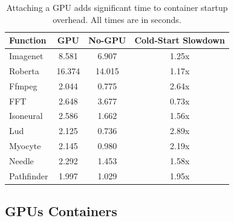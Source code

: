 \begin{table}
  \caption{Attaching a GPU adds significant time to container startup overhead. All times are in seconds.}
  \label{tab:gpu-attatch}
  \vspace{\captionspace}
  \begin{tabular}{lccc}
    \hline
    Function & GPU & No-GPU & Cold-Start Slowdown \\
    \hline
  Imagenet & 8.581 & 6.907 & 1.25x \\
  Roberta & 16.374 & 14.015 & 1.17x \\
  Ffmpeg & 2.044 & 0.775 & 2.64x \\
  FFT & 2.648 & 3.677 & 0.73x \\
  Isoneural & 2.586 & 1.662 & 1.56x \\
  Lud & 2.125 & 0.736 & 2.89x \\
  Myocyte & 2.145 & 0.980 & 2.19x \\
  Needle & 2.292 & 1.453 & 1.58x \\
  Pathfinder & 1.997 & 1.029 & 1.95x \\
  \end{tabular}
  \vspace{-0.4cm}
\end{table}

\subsection{GPUs Containers}

